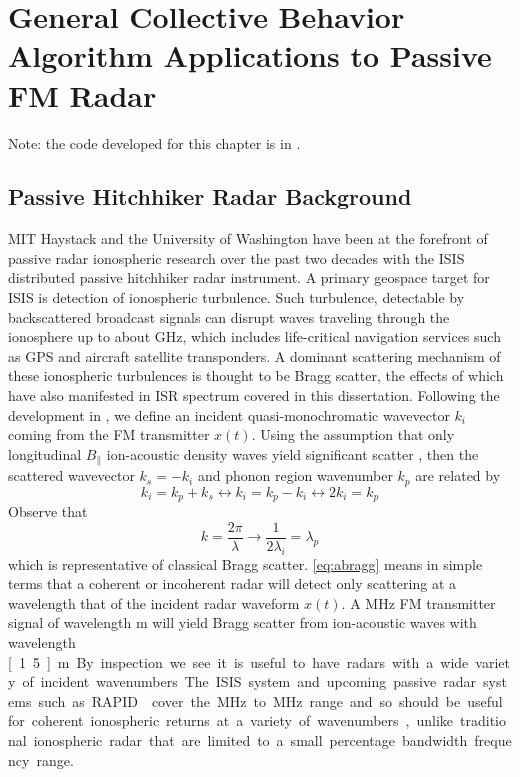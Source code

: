 \chapter{General Collective Behavior Algorithm Applications to Passive FM Radar}
\label{chapter:passive}
\thispagestyle{myheadings}

\graphicspath{{Passive/}}

Note: the code developed for this chapter is in \citet{cviono}.

\section{Passive Hitchhiker Radar Background}

MIT Haystack and the University of Washington have been at the forefront of passive radar ionospheric research over the past two decades with the ISIS distributed passive hitchhiker radar instrument.  
A primary geospace target for ISIS is detection of ionospheric turbulence.
Such turbulence, detectable by backscattered broadcast signals \citep{willisbook} can disrupt waves traveling through the ionosphere up to about \unit[2]{GHz}, which includes life-critical navigation services such as GPS and aircraft satellite transponders. 
A dominant scattering mechanism of these ionospheric turbulences is thought to be Bragg scatter, the effects of which have also manifested in ISR spectrum covered in this dissertation. 
Following the development in \citet{sahr2007}, we define an incident quasi-monochromatic wavevector $k_i$ coming from the FM transmitter $x(t)$. 
Using the assumption that only longitudinal $B_\parallel$ ion-acoustic density waves yield significant scatter \citep{stromme2006,sahr2007,thide1990}, then the scattered wavevector $k_s=-k_i$ and phonon region wavenumber $k_p$ are related by 
\begin{equation}
k_i = k_p + k_s \leftrightarrow k_i = k_p - k_i \leftrightarrow 2 k_i = k_p 
\end{equation}
Observe that 
\begin{equation}\label{eq:abragg}
k = \frac{2\pi}{\lambda} \rightarrow \frac{1}{2\lambda_i} = \lambda_p
\end{equation}
which is representative of classical Bragg scatter. 
\eqref{eq:abragg} means in simple terms that a coherent or incoherent radar will detect only scattering at a wavelength  that of the incident radar waveform $x(t)$. 
A \unit[100]{MHz} FM transmitter signal of wavelength \unit[3]{m} will yield Bragg scatter from ion-acoustic waves with wavelength \unit[1.5]{m}. 
By inspection we see it is useful to have radars with a wide variety of incident wavenumbers. 
The ISIS system and upcoming passive radar systems such as RAPID \citep{lind2015} cover the \unit[50]{MHz} to \unit[650]{MHz} range and so should be useful for coherent ionospheric returns at a variety of wavenumbers, unlike traditional ionospheric radar that are limited to a small percentage bandwidth frequency range.

